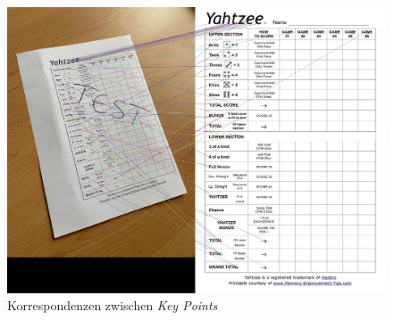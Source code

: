 \begin{figure}[H]
	\centering
	\includegraphics[width=\imgMed]{images/practice/correspondences.jpg}
	\caption{Korrespondenzen zwischen \textit{Key Points}} 
	\label{fig:correspondences}
\end{figure}

